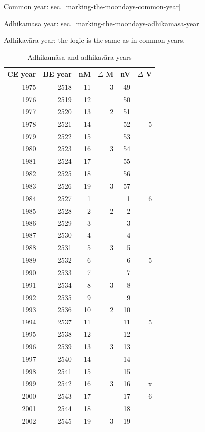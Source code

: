 \documentclass[11pt,oneside]{memoir-article}
\begin{document}
Common year: sec. \ref{marking-the-moondays-common-year}

Adhikamāsa year: sec. \ref{marking-the-moondays-adhikamasa-year}

Adhikavāra year: the logic is the same as in common years.

\begin{table}[h]
\begin{fullwidth}
\caption{\label{tbl-cycle-adhikamasa-adhikavara} Adhikamāsa and adhikavāra years}


\begin{multicols}{2}

\begin{center}
\begin{tabular}{rrrrrr}
CE year & BE year & nM & $\Delta$ M & nV & $\Delta$ V\\
\hline
1975 & 2518 & 11 & 3 & 49 & \\
1976 & 2519 & 12 &  & 50 & \\
1977 & 2520 & 13 & 2 & 51 & \\
1978 & 2521 & 14 &  & 52 & 5\\
1979 & 2522 & 15 &  & 53 & \\
1980 & 2523 & 16 & 3 & 54 & \\
1981 & 2524 & 17 &  & 55 & \\
1982 & 2525 & 18 &  & 56 & \\
1983 & 2526 & 19 & 3 & 57 & \\
1984 & 2527 & 1 &  & 1 & 6\\
1985 & 2528 & 2 & 2 & 2 & \\
1986 & 2529 & 3 &  & 3 & \\
1987 & 2530 & 4 &  & 4 & \\
1988 & 2531 & 5 & 3 & 5 & \\
1989 & 2532 & 6 &  & 6 & 5\\
1990 & 2533 & 7 &  & 7 & \\
1991 & 2534 & 8 & 3 & 8 & \\
1992 & 2535 & 9 &  & 9 & \\
1993 & 2536 & 10 & 2 & 10 & \\
1994 & 2537 & 11 &  & 11 & 5\\
1995 & 2538 & 12 &  & 12 & \\
1996 & 2539 & 13 & 3 & 13 & \\
1997 & 2540 & 14 &  & 14 & \\
1998 & 2541 & 15 &  & 15 & \\
1999 & 2542 & 16 & 3 & 16 & x\\
2000 & 2543 & 17 &  & 17 & 6\\
2001 & 2544 & 18 &  & 18 & \\
2002 & 2545 & 19 & 3 & 19 & \\
\end{tabular}
\end{center}


\end{multicols}
\end{fullwidth}
\end{table}
\end{document}
